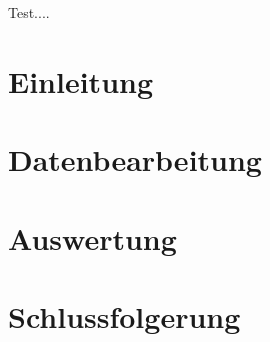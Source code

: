 \begin{refsection}
Test....

\section{Einleitung}

\section{Datenbearbeitung}

\section{Auswertung}

\section{Schlussfolgerung}

\printbibliography[heading=subbibliography]
\end{refsection}
